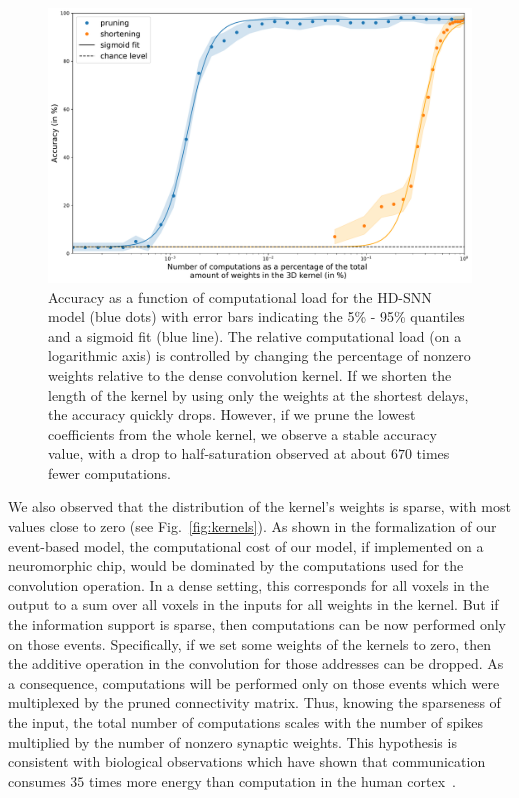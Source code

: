 \documentclass[default]{sn-jnl}%
\theoremstyle{thmstyleone}%
\theoremstyle{thmstyletwo}%
\theoremstyle{thmstylethree}%
\newcommand{\seeFig}[1]{see Fig.~\ref{fig:#1}}%
\begin{document}
\begin{figure}%
    \centering
    \includegraphics[width=0.95\linewidth]{figures/quant_accuracy.pdf}
    \caption{
        Accuracy as a function of computational load for the HD-SNN model (blue dots) with error bars indicating the 5\% - 95\% quantiles and a sigmoid fit (blue line). The relative computational load (on a logarithmic axis) is controlled by changing the percentage of nonzero weights relative to the dense convolution kernel. If we shorten the length of the kernel by using only the weights at the shortest delays, the accuracy quickly drops. However, if we prune the lowest coefficients from the whole kernel, we observe a stable accuracy value, with a drop to half-saturation observed at about $670$ times fewer computations.
        }
    \label{fig:accuracy}
\end{figure}
%
We also observed that the distribution of the kernel's weights is sparse, with most values close to zero (\seeFig{kernels}). As shown in the formalization of our event-based model, the computational cost of our model, if implemented on a neuromorphic chip, would be dominated by the computations used for the convolution operation. In a dense setting, this corresponds for all voxels in the output to a sum over all voxels in the inputs for all weights in the kernel. But if the information support is sparse, then computations can be now performed only on those events. Specifically, if we set some weights of the kernels to zero, then the additive operation in the convolution for those addresses can be dropped. As a consequence, computations will be performed only on those events which were multiplexed by the pruned connectivity matrix. Thus, knowing the sparseness of the input, the total number of computations scales with the number of spikes multiplied by the number of nonzero synaptic weights. This hypothesis is consistent with biological observations which have shown that communication consumes $35$ times more energy than computation in the human cortex~\citep{Levy2021}.
\end{document}
